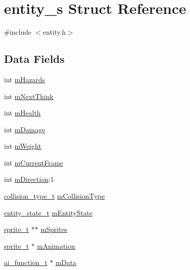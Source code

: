 \hypertarget{structentity__s}{}\section{entity\+\_\+s Struct Reference}
\label{structentity__s}


{\ttfamily \#include $<$entity.\+h$>$}

\subsection*{Data Fields}
\begin{DoxyCompactItemize}
\item 
int \hyperlink{structentity__s_a8c5ee6d8b825b6da8ab851320eccd45e}{m\+Hazards}
\item 
int \hyperlink{structentity__s_a24bdc1525ed5bcbf2a8c7027c9e1db5f}{m\+Next\+Think}
\item 
int \hyperlink{structentity__s_a709ed9fa7e17bcc63f51b9e011772aee}{m\+Health}
\item 
int \hyperlink{structentity__s_a890d42df13307b51280d145a6b05211d}{m\+Damage}
\item 
int \hyperlink{structentity__s_a069df5fe6b0f5a8eb03b0cc4c2e0ba43}{m\+Weight}
\item 
int \hyperlink{structentity__s_a4bf029653a0ffc8ad5dfddd243aeff72}{m\+Current\+Frame}
\item 
int \hyperlink{structentity__s_ada44c567bee8dbfa47693d4068507cab}{m\+Direction}\+:1
\item 
\hyperlink{globals_8h_a09e75d7e17aa0fd73648231363dcc13a}{collision\+\_\+type\+\_\+t} \hyperlink{structentity__s_afe71918d74f1053c28126544dce2f32b}{m\+Collision\+Type}
\item 
\hyperlink{globals_8h_a99f3d33a52ee74fc145c14ceee9d4154}{entity\+\_\+state\+\_\+t} \hyperlink{structentity__s_aa50a2f30db6a433d25f42fe58ee20995}{m\+Entity\+State}
\item 
\hyperlink{graphics_8h_a5371414b10358aeda7c6bcec8196342f}{sprite\+\_\+t} $\ast$$\ast$ \hyperlink{structentity__s_ad454ff27c8d769254a727750ac38592f}{m\+Sprites}
\item 
\hyperlink{graphics_8h_a5371414b10358aeda7c6bcec8196342f}{sprite\+\_\+t} $\ast$ \hyperlink{structentity__s_ab8851adbf3f67db41bcdac86f698b197}{m\+Animation}
\item 
\hyperlink{ai__interpret_8h_a93e23f66130135adeb83b13c29f36fca}{ai\+\_\+function\+\_\+t} $\ast$ \hyperlink{structentity__s_af3ccc93f657a50bc80718e0fe9ad367f}{m\+Data}
$$
\end{DoxyCompactItemize}
